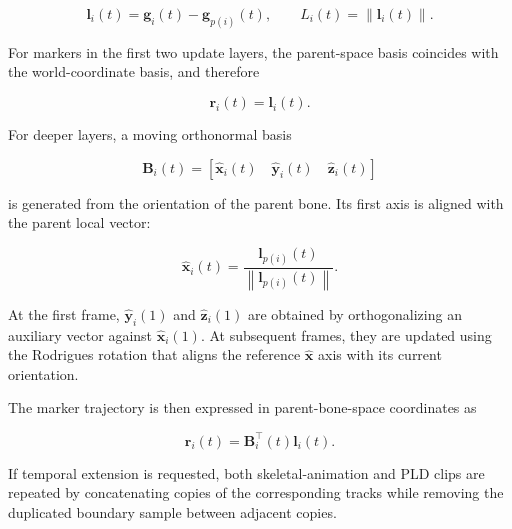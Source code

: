 \documentclass[12pt]{article}
\begin{document}
\begin{equation}
\mathbf{l}_i(t)
=
\mathbf{g}_i(t)
-
\mathbf{g}_{p(i)}(t),
\qquad
L_i(t)
=
\left\|\mathbf{l}_i(t)\right\|.
\label{eq:sup-local-vector}
\end{equation}

For markers in the first two update layers, the parent-space basis
coincides with the world-coordinate basis, and therefore

\begin{equation}
\mathbf{r}_i(t)
=
\mathbf{l}_i(t).
\label{eq:sup-first-layers}
\end{equation}

For deeper layers, a moving orthonormal basis

\begin{equation}
\mathbf{B}_i(t)
=
\left[
\hat{\mathbf{x}}_i(t)
\quad
\hat{\mathbf{y}}_i(t)
\quad
\hat{\mathbf{z}}_i(t)
\right]
\label{eq:sup-basis}
\end{equation}

is generated from the orientation of the parent bone. Its first axis is
aligned with the parent local vector:

\begin{equation}
\hat{\mathbf{x}}_i(t)
=
\frac{
\mathbf{l}_{p(i)}(t)
}{
\left\|
\mathbf{l}_{p(i)}(t)
\right\|
}.
\label{eq:sup-x-axis}
\end{equation}

At the first frame,
$\hat{\mathbf{y}}_i(1)$ and $\hat{\mathbf{z}}_i(1)$ are obtained by
orthogonalizing an auxiliary vector against
$\hat{\mathbf{x}}_i(1)$. At subsequent frames, they are updated using
the Rodrigues rotation that aligns the reference
$\hat{\mathbf{x}}$ axis with its current orientation.

The marker trajectory is then expressed in parent-bone-space
coordinates as

\begin{equation}
\mathbf{r}_i(t)
=
\mathbf{B}_i^{\top}(t)
\mathbf{l}_i(t).
\label{eq:sup-pld-parent-space}
\end{equation}

If temporal extension is requested, both skeletal-animation and PLD
clips are repeated by concatenating copies of the corresponding tracks
while removing the duplicated boundary sample between adjacent copies.


\end{document}
